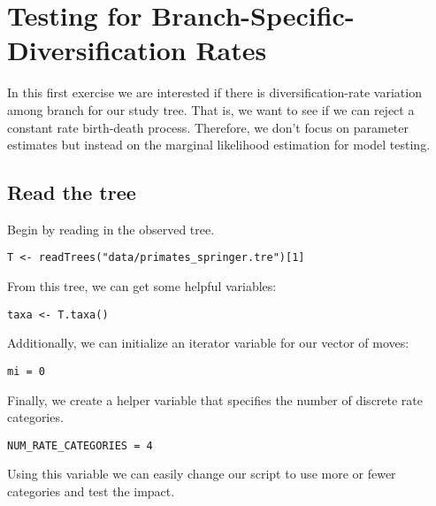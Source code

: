 \bigskip
\section{Testing for Branch-Specific-Diversification Rates}

In this first exercise we are interested if there is diversification-rate variation among branch for our study tree.
That is, we want to see if we can reject a constant rate birth-death process.
Therefore, we don't focus on parameter estimates but instead on the marginal likelihood estimation for model testing.



\subsection{Read the tree}

Begin by reading in the observed tree. 

{\tt \begin{snugshade*}
\begin{lstlisting}
T <- readTrees("data/primates_springer.tre")[1]
\end{lstlisting}
\end{snugshade*}}

From this tree, we can get some helpful variables:
{\tt \begin{snugshade*}
\begin{lstlisting}
taxa <- T.taxa()
\end{lstlisting}
\end{snugshade*}}

Additionally, we can initialize an iterator variable for our vector of moves:
{\tt \begin{snugshade*}
\begin{lstlisting}
mi = 0
\end{lstlisting}
\end{snugshade*}}

Finally, we create a helper variable that specifies the number of discrete rate categories.
{\tt \begin{snugshade*}
\begin{lstlisting}
NUM_RATE_CATEGORIES = 4
\end{lstlisting}
\end{snugshade*}}
Using this variable we can easily change our script to use more or fewer categories and test the impact.




